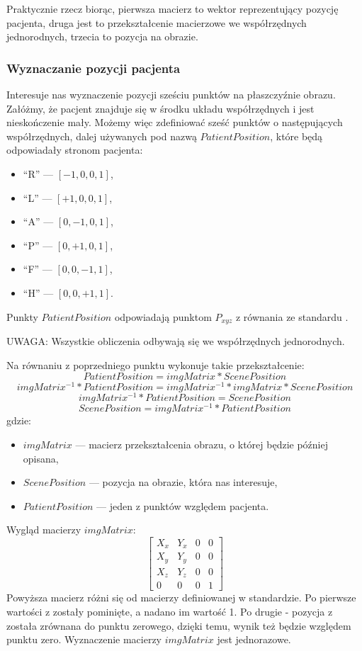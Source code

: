 Praktycznie rzecz biorąc, pierwsza macierz to wektor reprezentujący pozycję pacjenta, druga jest to przekształcenie macierzowe we współrzędnych jednorodnych, trzecia to pozycja na obrazie.

\subsubsection{Wyznaczanie pozycji pacjenta}

Interesuje nas wyznaczenie pozycji sześciu punktów na płaszczyźnie obrazu.
Załóżmy, że pacjent znajduje się w środku układu współrzędnych i jest nieskończenie mały.
Możemy więc zdefiniować sześć punktów o następujących współrzędnych, dalej używanych pod nazwą $PatientPosition$, które będą odpowiadały stronom pacjenta:
\begin{itemize}
    \item \enquote{R} --- $[-1, 0, 0, 1]$,
    \item \enquote{L} --- $[+1, 0, 0, 1]$,
    \item \enquote{A} --- $[0, -1, 0, 1]$,
    \item \enquote{P} --- $[0, +1, 0, 1]$,
    \item \enquote{F} --- $[0, 0, -1, 1]$,
    \item \enquote{H} --- $[0, 0, +1, 1]$.
\end{itemize}
Punkty $PatientPosition$ odpowiadają punktom $P_{xyz}$ z równania ze standardu \DICOM.

\par
UWAGA: Wszystkie obliczenia odbywają się we współrzędnych jednorodnych.

\par
Na równaniu z poprzedniego punktu wykonuje takie przekształcenie:
\[PatientPosition = imgMatrix * ScenePosition\]
\[imgMatrix^{-1} * PatientPosition = imgMatrix^{-1} * imgMatrix * ScenePosition\]
\[imgMatrix^{-1} * PatientPosition = ScenePosition\]
\[ScenePosition = imgMatrix^{-1} * PatientPosition\]
gdzie:
\begin{itemize}
    \item $imgMatrix$ --- macierz przekształcenia obrazu, o której będzie później opisana,
    \item $ScenePosition$ --- pozycja na obrazie, która nas interesuje,
    \item $PatientPosition$ --- jeden z punktów względem pacjenta.
\end{itemize}
\par
Wygląd macierzy $imgMatrix$:
\[
    \begin{bmatrix}
        X_x & Y_x & 0 & 0 \\
        X_y & Y_y & 0 & 0 \\
        X_z & Y_z & 0 & 0 \\
        0   & 0   & 0 & 1
    \end{bmatrix}
\]
Powyższa macierz różni się od macierzy definiowanej w standardzie.
Po pierwsze wartości z  zostały pominięte, a nadano im wartość 1.
Po drugie - pozycja z  została zrównana do punktu zerowego, dzięki temu, wynik też będzie względem punktu zero.
Wyznaczenie macierzy $imgMatrix$ jest jednorazowe.


